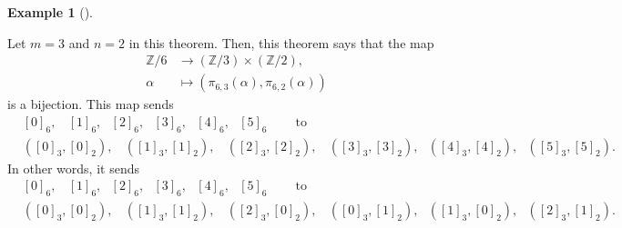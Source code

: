 \documentclass[numbers=enddot,12pt,final,onecolumn,notitlepage]{scrartcl}%
\numberwithin{exer}{subsection}
\theoremstyle{definition}
\newtheorem{exam}[theo]{Example}
\newenvironment{example}[1][]
{\begin{exam}[#1]\begin{leftbar}}
{\end{leftbar}\end{exam}}
\begin{document}
\begin{example}
Let $m=3$ and $n=2$ in this theorem. Then, this theorem says that the map%
\begin{align*}
\mathbb{Z}/6  &  \rightarrow\left(  \mathbb{Z}/3\right)  \times\left(
\mathbb{Z}/2\right)  ,\\
\alpha &  \mapsto\left(  \pi_{6,3}\left(  \alpha\right)  ,\pi_{6,2}\left(
\alpha\right)  \right)
\end{align*}
is a bijection. This map sends%
\begin{align*}
&  \left[  0\right]  _{6},\ \ \ \ \left[  1\right]  _{6},\ \ \ \left[
2\right]  _{6},\ \ \ \left[  3\right]  _{6},\ \ \ \left[  4\right]
_{6},\ \ \ \left[  5\right]  _{6}\ \ \ \ \ \ \ \ \ \ \text{to}\\
&  \left(  \left[  0\right]  _{3},\left[  0\right]  _{2}\right)
,\ \ \ \ \left(  \left[  1\right]  _{3},\left[  1\right]  _{2}\right)
,\ \ \ \ \left(  \left[  2\right]  _{3},\left[  2\right]  _{2}\right)
,\ \ \ \ \left(  \left[  3\right]  _{3},\left[  3\right]  _{2}\right)
,\ \ \ \left(  \left[  4\right]  _{3},\left[  4\right]  _{2}\right)
,\ \ \ \left(  \left[  5\right]  _{3},\left[  5\right]  _{2}\right)  .
\end{align*}
In other words, it sends%
\begin{align*}
&  \left[  0\right]  _{6},\ \ \ \ \left[  1\right]  _{6},\ \ \ \left[
2\right]  _{6},\ \ \ \left[  3\right]  _{6},\ \ \ \left[  4\right]
_{6},\ \ \ \left[  5\right]  _{6}\ \ \ \ \ \ \ \ \ \ \text{to}\\
&  \left(  \left[  0\right]  _{3},\left[  0\right]  _{2}\right)
,\ \ \ \ \left(  \left[  1\right]  _{3},\left[  1\right]  _{2}\right)
,\ \ \ \ \left(  \left[  2\right]  _{3},\left[  0\right]  _{2}\right)
,\ \ \ \ \left(  \left[  0\right]  _{3},\left[  1\right]  _{2}\right)
,\ \ \ \left(  \left[  1\right]  _{3},\left[  0\right]  _{2}\right)
,\ \ \ \left(  \left[  2\right]  _{3},\left[  1\right]  _{2}\right)  .
\end{align*}

\end{example}
\end{document}
